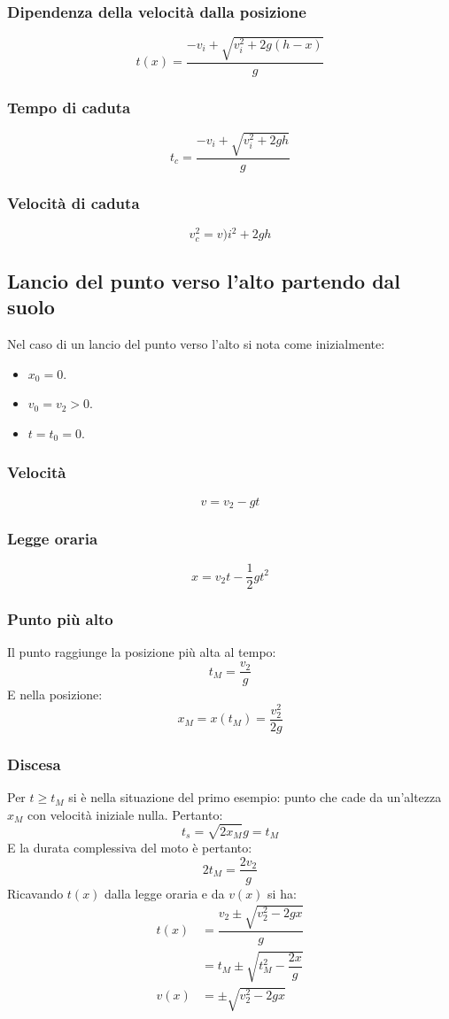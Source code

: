 \documentclass[class=book, crop=false, oneside, 12pt]{standalone}
\begin{document}
		\subsubsection{Dipendenza della velocit\`a dalla posizione}
		$$t(x) = \dfrac{-v_i+\sqrt{v_i^2+2g(h-x)}}{g}$$
		\subsubsection{Tempo di caduta}
		$$t_c = \dfrac{-v_i+\sqrt{v_i^2+2gh}}{g}$$
		\subsubsection{Velocit\`a di caduta}
		$$v_c^2=v)i^2+2gh$$
	\subsection{Lancio del punto verso l'alto partendo dal suolo}
	Nel caso di un lancio del punto verso l'alto si nota come inizialmente:
	\begin{multicols}{3}
		\begin{itemize}
			\item $x_0=0$.
			\item $v_0 = v_2 > 0$.
			\item $t=t_0=0$.
		\end{itemize}
	\end{multicols}
		\subsubsection{Velocit\`a}
		$$v=v_2 - gt$$
		\subsubsection{Legge oraria}
		$$x = v_2t-\dfrac{1}{2}gt^2$$
		\subsubsection{Punto pi\`u alto}
		Il punto raggiunge la posizione pi\`u alta al tempo:
		$$t_M = \dfrac{v_2}{g}$$
		E nella posizione:
		$$x_M=x(t_M)=\dfrac{v_2^2}{2g}$$
		\subsubsection{Discesa}
		Per $t\ge t_M$ si \`e nella situazione del primo esempio: punto che cade da un'altezza $x_M$ con velocit\`a iniziale nulla.
		Pertanto:
		$$t_s = \sqrt{2x_M}{g}=t_M$$
		E la durata complessiva del moto \`e pertanto:
		$$2t_M = \dfrac{2v_2}{g}$$
		Ricavando $t(x)$ dalla legge oraria e da $v(x)$ si ha:
		\begin{align*}
			t(x) &= \dfrac{v_2\pm \sqrt{v_2^2 - 2gx}}{g}\\
			     &= t_M \pm \sqrt{t_M^2 - \dfrac{2x}{g}}\\
			v(x) &= \pm \sqrt{v_2^2 - 2gx}
		\end{align*}
\end{document}
